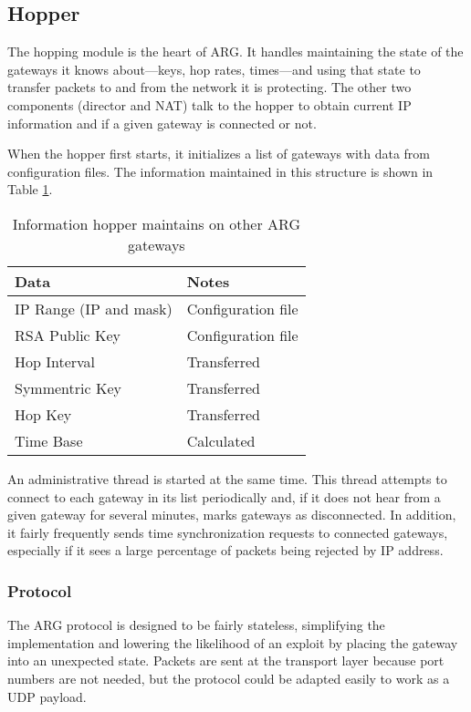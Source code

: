 \subsection{Hopper}
\label{sec:arg_hopper}
\par The hopping module is the heart of ARG. It handles maintaining the state of the gateways it knows about---keys, hop rates, times---and using that state to transfer packets to and from the network it is protecting. The other two components (director and \ac{NAT}) talk to the hopper to obtain current IP information and if a given gateway is connected or not.

\par When the hopper first starts, it initializes a list of gateways with data from configuration files. The information maintained in this structure is shown in Table \ref{tab:gatestate}. 

\begin{centering}
\begin{table}
\caption{Information hopper maintains on other ARG gateways}
\label{tab:gatestate}
\centering
\begin{tabular}{l|l}
	Data & Notes \\
	\hline
	IP Range (IP and mask) & Configuration file \\
	\ac{RSA} Public Key & Configuration file \\
	Hop Interval & Transferred \\
	Symmentric Key & Transferred \\
	Hop Key & Transferred \\
	Time Base & Calculated \\
\end{tabular}
\end{table}
\end{centering}

\par An administrative thread is started at the same time. This thread attempts to connect to each gateway in its list periodically and, if it does not hear from a given gateway for several minutes, marks gateways as disconnected. In addition, it fairly frequently sends time synchronization requests to connected gateways, especially if it sees a large percentage of packets being rejected by \ac{IP} address. 

\subsubsection{Protocol}
\label{sec:arg_protocol}
\par The \ac{ARG} protocol is designed to be fairly stateless, simplifying the implementation and lowering the likelihood of an exploit by placing the gateway into an unexpected state. Packets are sent at the transport layer because port numbers are not needed, but the protocol could be adapted easily to work as a \ac{UDP} payload.

